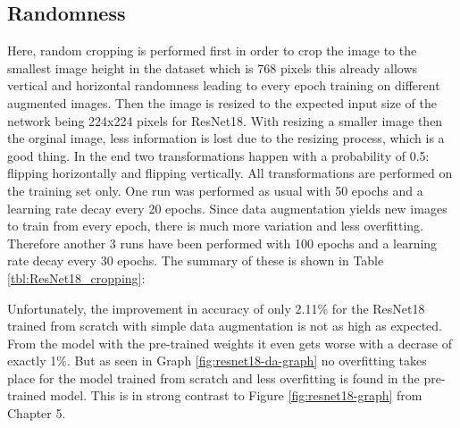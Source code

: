 \subsection{Randomness}

Here, random cropping is performed first in order to crop the image to the smallest image height in the dataset which is 768 pixels this already allows vertical and horizontal randomness leading to every epoch training on different augmented images. Then the image is resized to the expected input size of the network being 224x224 pixels for ResNet18. With resizing a  smaller image then the orginal image, less information is lost due to the resizing process, which is a good  thing. In the end two transformations happen with a probability of 0.5: flipping horizontally and flipping vertically. All transformations are performed on the training set only. One run was  performed as usual with 50 epochs  and a  learning rate decay every 20 epochs. Since data augmentation yields new images to  train from every epoch, there is  much more variation and less  overfitting. Therefore another 3 runs have been performed with 100 epochs and a learning rate decay every  30 epochs. The summary of these is shown in Table \ref{tbl:ResNet18_cropping}: \\


\begin{table}[h] \centering
{}
\caption{Cropping, resizing and  random flipping performed on the ResNet18 architecture with and without transfer learning. The first row is a run with the original configuration without any randomness or cropping and serves as comparison.}
\label{tbl:ResNet18_cropping}
\end{table}

Unfortunately, the improvement in accuracy of only 2.11\% for the ResNet18 trained from scratch with simple data augmentation is not as high as expected. From the model with the pre-trained weights it even gets worse with a decrase of exactly 1\%. But as seen in Graph \ref{fig:resnet18-da-graph} no overfitting takes place for the model trained from scratch and less overfitting is found in the pre-trained model. This is in strong contrast to Figure \ref{fig:resnet18-graph} from Chapter 5.

